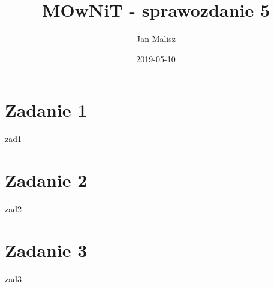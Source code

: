 \documentclass[10pt,a4paper]{article}
\title{MOwNiT - sprawozdanie 5}
\author{Jan Malisz}
\date{2019-05-10}
\begin{document}
  \maketitle
  \thispagestyle{empty}

  \newpage
  \section*{Zadanie 1}\label{sec:Zadanie1}
  {zad1}

  \newpage
  \section*{Zadanie 2}\label{sec:Zadanie2}
  {zad2}

  \newpage
  \section*{Zadanie 3}\label{sec:Zadanie3}
  {zad3}
\end{document}
